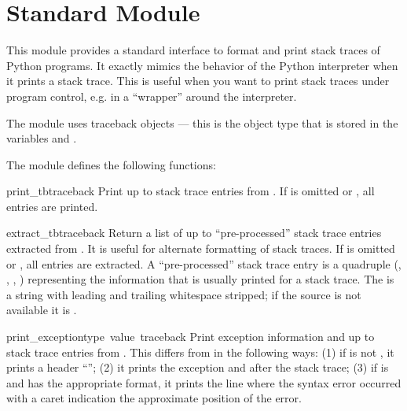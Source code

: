 \section{Standard Module }
\label{module-traceback}

\renewcommand{\indexsubitem}{(in module traceback)}

This module provides a standard interface to format and print stack
traces of Python programs.  It exactly mimics the behavior of the
Python interpreter when it prints a stack trace.  This is useful when
you want to print stack traces under program control, e.g. in a
``wrapper'' around the interpreter.

The module uses traceback objects --- this is the object type
that is stored in the variables  and
.

The module defines the following functions:

\begin{funcdesc}{print_tb}{traceback}
Print up to  stack trace entries from .  If
 is omitted or , all entries are printed.
\end{funcdesc}

\begin{funcdesc}{extract_tb}{traceback}
Return a list of up to  ``pre-processed'' stack trace
entries extracted from .  It is useful for alternate
formatting of stack traces.  If  is omitted or ,
all entries are extracted.  A ``pre-processed'' stack trace entry is a
quadruple (, , ,
) representing the information that is usually printed
for a stack trace.  The  is a string with leading and
trailing whitespace stripped; if the source is not available it is
.
\end{funcdesc}

\begin{funcdesc}{print_exception}{type\, value\, traceback}
Print exception information and up to  stack trace entries
from .  This differs from  in the
following ways: (1) if  is not , it prints a
header ``''; (2) it prints the
exception  and  after the stack trace; (3) if
 is  and  has the appropriate
format, it prints the line where the syntax error occurred with a
caret indication the approximate position of the error.
\end{funcdesc}

